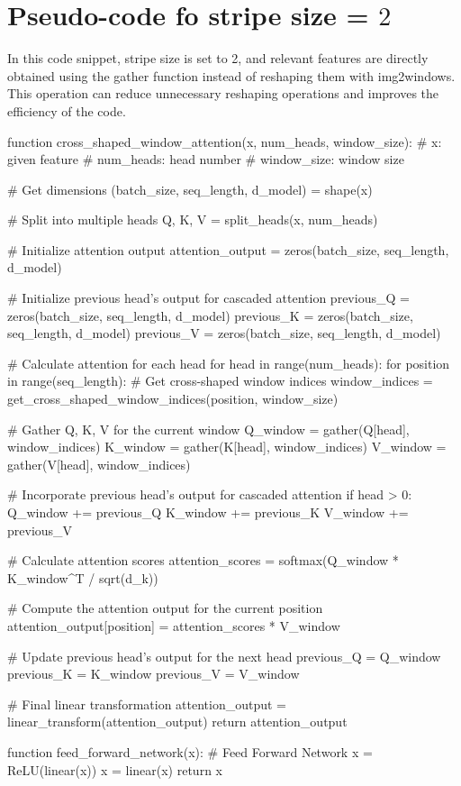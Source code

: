 \section{Pseudo-code fo stripe size = $2$}
\label{secS8}
In this code snippet, stripe size is set to 2, and relevant features are directly obtained using the gather function instead of reshaping them with img2windows. This operation can reduce unnecessary reshaping operations and improves the efficiency of the code.
\begin{python}
function cross_shaped_window_attention(x, num_heads, window_size):
    # x: given feature
    # num_heads: head number
    # window_size: window size

    # Get dimensions
    (batch_size, seq_length, d_model) = shape(x)

    # Split into multiple heads
    Q, K, V = split_heads(x, num_heads)

    # Initialize attention output
    attention_output = zeros(batch_size, seq_length, d_model)

    # Initialize previous head's output for cascaded attention
    previous_Q = zeros(batch_size, seq_length, d_model)
    previous_K = zeros(batch_size, seq_length, d_model)
    previous_V = zeros(batch_size, seq_length, d_model)

    # Calculate attention for each head
    for head in range(num_heads):
        for position in range(seq_length):
            # Get cross-shaped window indices
            window_indices = get_cross_shaped_window_indices(position, window_size)

            # Gather Q, K, V for the current window
            Q_window = gather(Q[head], window_indices)
            K_window = gather(K[head], window_indices)
            V_window = gather(V[head], window_indices)

            # Incorporate previous head's output for cascaded attention
            if head > 0:
                Q_window += previous_Q
                K_window += previous_K
                V_window += previous_V

            # Calculate attention scores
            attention_scores = softmax(Q_window * K_window^T / sqrt(d_k))

            # Compute the attention output for the current position
            attention_output[position] = attention_scores * V_window

        # Update previous head's output for the next head
        previous_Q = Q_window
        previous_K = K_window
        previous_V = V_window

    # Final linear transformation
    attention_output = linear_transform(attention_output)
    return attention_output

function feed_forward_network(x):
    # Feed Forward Network
    x = ReLU(linear(x))
    x = linear(x)
    return x
\end{python}

